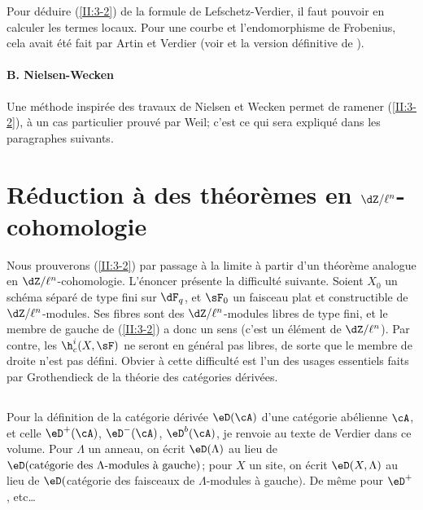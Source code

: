 Pour déduire (\ref{II:3-2}) de la formule de Lefschetz-Verdier, il faut 
pouvoir en calculer les termes locaux. Pour une courbe et l'endomorphisme de 
Frobenius, cela avait été fait par Artin et Verdier (voir  et la version définitive de ). 


\paragraph{B. Nielsen-Wecken}
Une méthode inspirée des travaux de Nielsen et Wecken permet de ramener 
(\ref{II:3-2}), à un cas particulier prouvé par Weil; c'est ce qui sera 
expliqué dans les paragraphes suivants. 










\section{Réduction à des théorèmes en \texorpdfstring{$\dZ/\ell^n$}{Z/l n}-cohomologie}\label{II:4}

Nous prouverons (\ref{II:3-2}) par passage à la limite à partir d'un 
théorème analogue en $\dZ/\ell^n$-cohomologie. L'énoncer présente la 
difficulté suivante. Soient $X_0$ un schéma séparé de type fini sur 
$\dF_q$, et $\sF_0$ un faisceau plat et constructible de $\dZ/\ell^n$-modules. 
Ses fibres sont des $\dZ/\ell^n$-modules libres de type fini, et le membre de 
gauche de (\ref{II:3-2}) a donc un sens (c'est un élément de $\dZ/\ell^n$). 
Par contre, les $\h_c^i(X,\sF)$ ne seront en général pas libres, de sorte 
que le membre de droite n'est pas défini. Obvier à cette difficulté est 
l'un des usages essentiels faits par Grothendieck de la théorie des 
catégories dérivées.





\subsection{}\label{II:4-1}

Pour la définition de la catégorie dérivée $\eD(\cA)$ d'une catégorie 
abélienne $\cA$, et celle  $\eD^+(\cA)$, $\eD^-(\cA)$, 
$\eD^b(\cA)$, je renvoie au texte de Verdier dans ce volume. Pour $\Lambda$ 
un anneau, on écrit $\eD(\Lambda)$ au lieu de 
$\eD(\text{catégorie des $\Lambda$-modules à gauche})$; pour $X$ un site, on 
écrit $\eD(X,\Lambda)$ au lieu de 
$\eD($catégorie des faisceaux de $\Lambda$-modules à gauche$)$. De 
même pour $\eD^+$, etc\ldots

